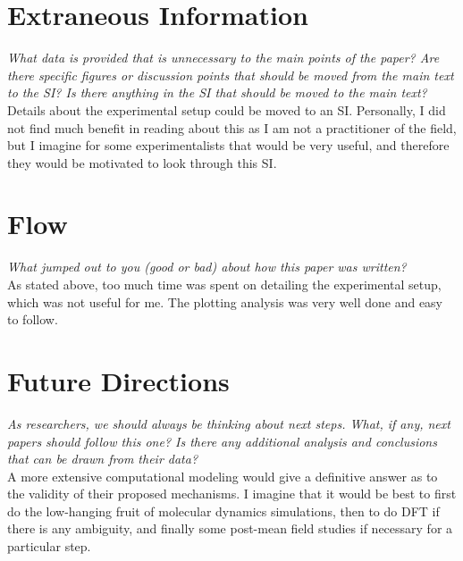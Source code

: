 \documentclass[12pt]{article}
\begin{document}
\section*{Extraneous Information}
\textit{What data is provided that is unnecessary to the main points of the paper? Are there specific figures or discussion points that should be moved from the main text to the SI? Is there anything in the SI that should be moved to the main text?}\\[4pt]
Details about the experimental setup could be moved to an SI. Personally, I did not find much benefit in reading about this as I am not a practitioner of the field, but I imagine for some experimentalists that would be very useful, and therefore they would be motivated to look through this SI.

\section*{Flow}
\textit{What jumped out to you (good or bad) about how this paper was written?}\\[4pt]
As stated above, too much time was spent on detailing the experimental setup, which was not useful for me. The plotting analysis was very well done and easy to follow.

\section*{Future Directions}
\textit{As researchers, we should always be thinking about next steps. What, if any, next papers should follow this one? Is there any additional analysis and conclusions that can be drawn from their data?}\\[4pt]
A more extensive computational modeling would give a definitive answer as to the validity of their proposed mechanisms. I imagine that it would be best to first do the low-hanging fruit of molecular dynamics simulations, then to do DFT if there is any ambiguity, and finally some post-mean field studies if necessary for a particular step.
\end{document}
